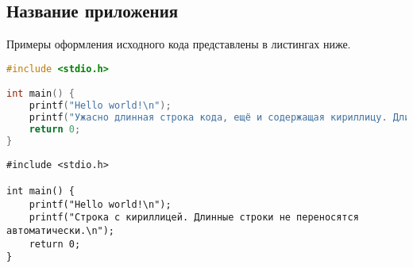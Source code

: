 \newcommand{\sectionset}{\centering\normalsize\normalfont\bfseries\expandafter\uppercase}
{}
\begin{appendices}
\renewcommand{\thesection}{\Asbuk{section}}

\newpage
\section{Название приложения}

Примеры оформления исходного кода представлены в листингах ниже.

\begin{lstlisting}[language=C]
#include <stdio.h>

int main() {
	printf("Hello world!\n");
	printf("Ужасно длинная строка кода, ещё и содержащая кириллицу. Длинные строки переносятся автоматически, но это можно отключить.\n");
	return 0;
}
\end{lstlisting}

\begin{code}
\begin{verbatim}
#include <stdio.h>

int main() {
    printf("Hello world!\n");
    printf("Строка с кириллицей. Длинные строки не переносятся автоматически.\n");
    return 0;
}
\end{verbatim}
\end{code}

\end{appendices}
